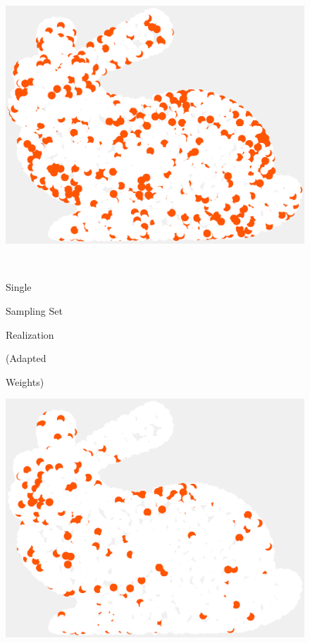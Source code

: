 \documentclass[journal, 10pt]{IEEEtran}
\begin{document}
\begin{figure}[H]
\begin{minipage}[m]{0.4\linewidth}
\centerline{\includegraphics[width=.85\linewidth]{fig_rec_band_selected}}
\end{minipage} \\
\begin{minipage}[m]{0.16\linewidth}
\centerline{\small{Single}}
\centerline{\small{Sampling Set}}
\centerline{\small{Realization}}
\centerline{\small{(Adapted}}
\centerline{\small{Weights)}}
\end{minipage}
\begin{minipage}[m]{0.4\linewidth}
\centerline{\includegraphics[width=.85\linewidth]{fig_rec_low_selected_adapted}}
\end{minipage}
\begin{minipage}[m]{0.4\linewidth}

\end{minipage}
\end{figure}
\end{document}
